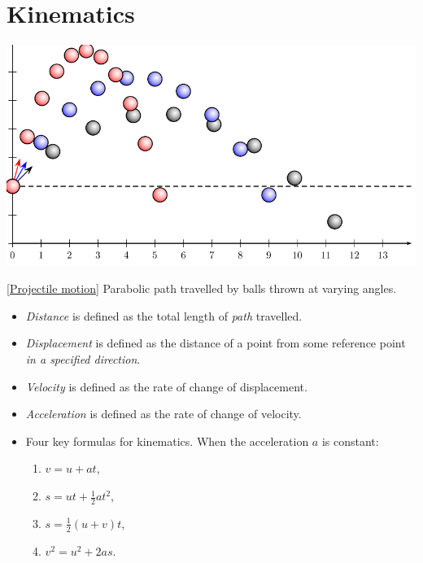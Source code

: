 \documentclass[oneside]{book}
\begin{document}


\raggedright
\chapter{Kinematics}
\begin{center}
    \includegraphics[width=\textwidth]{../images/Kinematics/schieferWurf.pdf}
    \captionsetup{type=figure}
    \caption[figure]{\ref{Projectile motion} Parabolic path travelled by balls thrown at varying angles.}
\end{center}
\begin{itemize}
    \item \emph{Distance} is defined as the total length of \emph{path} travelled.
    \item \emph{Displacement} is defined as the distance of a point from some reference point \emph{in a specified direction}.
    \item \emph{Velocity} is defined as the rate of change of displacement.
    \item \emph{Acceleration} is defined as the rate of change of velocity.
    \item Four key formulas for kinematics. When the  acceleration \(a\) is constant:
    \begin{enumerate}
        \item \(v=u+at\),
        \item \(s=ut+\frac{1}{2}at^2\),
        \item \(s=\frac{1}{2}(u+v)t\),
        \item \(v^2=u^2+2as\).
    \end{enumerate}
\end{itemize}
\end{document}

